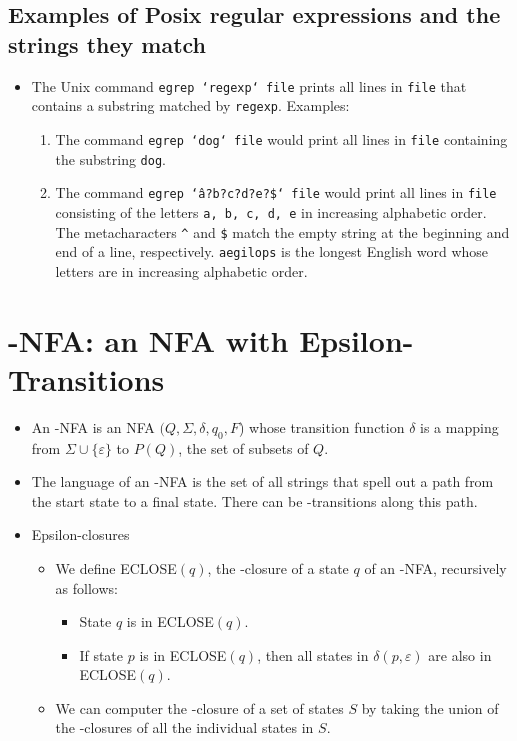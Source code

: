 \documentclass[]{article}
\begin{document}
  \subsection*{Examples of Posix regular expressions and the strings they match}
    \begin{itemize}
      \item The Unix command \texttt{egrep `regexp` file} prints all lines in
            \texttt{file} that contains a substring matched by \texttt{regexp}.
            Examples:
        \begin{enumerate}
          \item The command \texttt{egrep `dog` file} would print all lines in
                \texttt{file} containing the substring \texttt{dog}.
          \item The command \texttt{egrep `\^a?b?c?d?e?\$` file} would print all
                lines in \texttt{file} consisting of the letters \texttt{a, b,
                c, d, e} in increasing alphabetic order. The metacharacters
                \texttt{\^} and \texttt{\$} match the empty string at the
                beginning and end of a line, respectively. \texttt{aegilops} is
                the longest English word whose letters are in increasing
                alphabetic order.
        \end{enumerate}
    \end{itemize}

\section{\textepsilon-NFA: an NFA with Epsilon-Transitions}
  \begin{itemize}
    \item An \textepsilon-NFA is an NFA $(Q, \Sigma, \delta, q_0, F$) whose
    transition function $\delta$ is a mapping from
    $\Sigma \cup \{ \varepsilon \}$ to $P(Q)$, the set of subsets of $Q$.
    \item The language of an \textepsilon-NFA is the set of all strings that
    spell out a path from the start state to a final state. There can be
    \textepsilon-transitions along this path.
    \item Epsilon-closures
      \begin{itemize}
        \item We define ECLOSE$(q)$, the \textepsilon-closure of a state $q$ of
        an \textepsilon-NFA, recursively as follows:
          \begin{itemize}
            \item State $q$ is in ECLOSE$(q)$.
            \item If state $p$ is in ECLOSE$(q)$, then all states in $\delta(p,
            \varepsilon)$ are also in ECLOSE$(q)$.
          \end{itemize}
        \item We can computer the \textepsilon-closure of a set of states $S$ by
        taking the union of the \textepsilon-closures of all the individual
        states in $S$.
      \end{itemize}
  \end{itemize}
\end{document}
